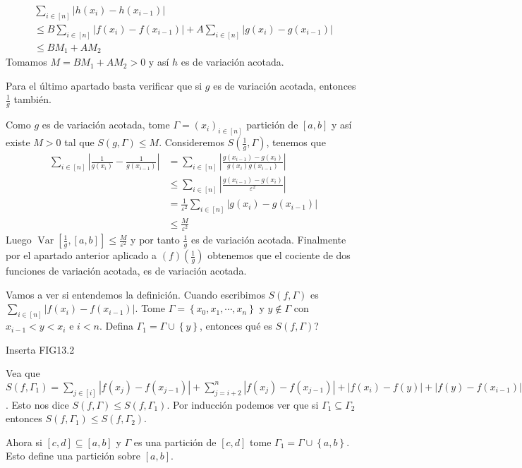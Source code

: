 \documentclass[12pt]{article}
\theoremstyle{plain}
\theoremstyle{definition}
\theoremstyle{remark}
\numberwithin{equation}{section}
\DeclareMathOperator{\Var}{Var}     %
\renewcommand{\leq}{\leqslant}      %
\renewcommand{\:}{\colon}           %
\newcommand{\conj}[1]{\left\lbrace#1\right\rbrace}
\newcommand{\bonj}[1]{\left\lbrack#1\right\rbrack}
\begin{document}
\begin{multicols}{2}
\begin{ptcbp}
        \begin{gather*}
        \sum_{i\in\bonj{n}}|h(x_i)-h(x_{i-1})|\\
        \leq B\sum_{i\in\bonj{n}}|f(x_i)-f(x_{i-1})|+A\sum_{i\in\bonj{n}}|g(x_i)-g(x_{i-1})|\\
        \leq BM_1+AM_2
      \end{gather*}
      Tomamos $M=BM_1+AM_2>0$ y así $h$ es de variación acotada.\par
      \quad Para el último apartado basta verificar que si $g$ es de variación acotada, entonces $\frac{1}{g}$ también. \par
      Como $g$ es de variación acotada, tome $\Gamma=(x_i)_{i\in\bonj{n}}$ partición de $\bonj{a,b}$ y así existe $M>0$ tal que $S(g,\Gamma)\leq M$. Consideremos $S(\frac{1}{g},\Gamma)$, tenemos que
      \begin{align*}
        \sum_{i\in\bonj{n}}\left|\frac{1}{g(x_i)}-\frac{1}{g(x_{i-1})}\right| &=\sum_{i\in\bonj{n}}\left|\frac{g(x_{i-1})-g(x_{i})}{g(x_i)g(x_{i-1})}\right|\\
        &\leq \sum_{i\in\bonj{n}}\left|\frac{g(x_{i-1})-g(x_{i})}{\varepsilon^2}\right|\\
        &=\frac{1}{\varepsilon^2}\sum_{i\in\bonj{n}}\left|g(x_{i})-g(x_{i-1})\right|\\
        &\leq\frac{M}{\varepsilon^2}
      \end{align*}
Luego $\Var\bonj{\frac{1}{g},\bonj{a,b}}\leq\frac{M}{\varepsilon^2}$ y por tanto $\frac{1}{g}$ es de variación acotada. Finalmente por el apartado anterior aplicado a $(f)(\frac{1}{g})$ obtenemos que el cociente de dos funciones de variación acotada, es de variación acotada.
\end{ptcbp}
Vamos a ver si entendemos la definición. Cuando escribimos $S(f,\Gamma)$ es $\sum_{i\in\bonj{n}}|f(x_i)-f(x_{i-1})|$. Tome $\Gamma=\conj{x_0,x_1,\cdots,x_n}$ y $y\not\in\Gamma$ con $x_{i-1}<y<x_i$ e $i<n$. Defina $\Gamma_1=\Gamma\cup\conj{y}$, entonces qué es $S(f,\Gamma)$?\par
Inserta FIG13.2\par
Vea que $S(f,\Gamma_1)=\sum_{j\in\bonj{i}}|f(x_j)-f(x_{j-1})|+\sum_{j=i+2}^n|f(x_j)-f(x_{j-1})|+|f(x_i)-f(y)|+|f(y)-f(x_{i-1})|$. Esto nos dice $S(f,\Gamma)\leq S(f,\Gamma_1)$. Por inducción podemos ver que si $\Gamma_1\subseteq\Gamma_2$ entonces $S(f,\Gamma_1)\leq S(f,\Gamma_2)$.\par
Ahora si $\bonj{c,d}\subseteq\bonj{a,b}$ y $\Gamma$ es una partición de $\bonj{c,d}$ tome $\Gamma_1=\Gamma\cup\conj{a,b}$. Esto define una partición sobre $\bonj{a,b}$.\par

\end{multicols}
\end{document}

